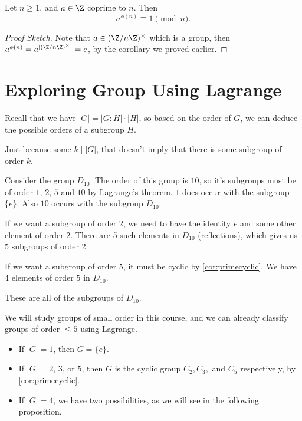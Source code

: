 \documentclass[a4]{scrreprt}
\begin{document}
\begin{theorem}
	Let $n \geq 1$, and $a \in \Z$ coprime to $n$. Then
	$$
	a^{\phi(n)} \equiv 1 \pmod{n}.
	$$
\end{theorem}
\begin{proof}[Proof Sketch]
	Note that $a \in (\Z/n\Z)^\times$ which is a group, then $a^{\phi(n)} = a^{| (\Z/n\Z)^\times|} = e$, by the corollary we proved earlier.
\end{proof}

\section{Exploring Group Using Lagrange}

Recall that we have $|G| = |G:H| \cdot |H|$, so based on the order of $G$, we can deduce the possible orders of a subgroup $H$.

\begin{remark}
	Just because some $k \mid |G|$, that doesn't imply that there is some subgroup of order $k$.
\end{remark}

\begin{example}[Subgroups of $D_{10}$]
	Consider the group $D_{10}$. The order of this group is $10$, so it's subgroups must be of order $1$, $2$, $5$ and $10$ by Lagrange's theorem.
	$1$ does occur with the subgroup $\{e\}$. Also $10$ occurs with the subgroup $D_{10}$.

	If we want a subgroup of order $2$, we need to have the identity $e$ and some other element of order $2$. There are 5 such elements in $D_{10}$ (reflections), which gives us $5$ subgroups of order 2.

	If we want a subgroup of order $5$, it must be cyclic by \autoref{cor:primecyclic}. We have $4$ elements of order $5$ in $D_{10}$.

	These are all of the subgroups of $D_{10}$.
\end{example}

We will study groups of small order in this course, and we can already classify groups of order $\leq 5$ using Lagrange.

\begin{itemize}
	\item If $|G| = 1$, then $G = \{e\}$.
	\item If $|G| = 2$, $3$, or $5$, then $G$ is the cyclic group $C_2, C_3,$ and $C_5$ respectively, by \autoref{cor:primecyclic}.
	\item If $|G| = 4$, we have two possibilities, as we will see in the following proposition.
\end{itemize}
\end{document}
